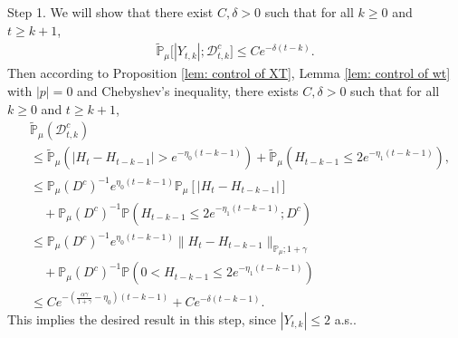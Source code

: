 \documentclass[12pt,a4paper]{amsart}
\theoremstyle{plain}
\theoremstyle{definition}
\numberwithin{equation}{section}
\begin{document}
    Step 1. We will show that there exist $C,\delta >0$ such that for all $k \geq 0$ and $t\geq k+1$,
\begin{equation}\begin{split}
\label{thm121}
    \mathbb{\tilde{P}}_{\mu}\big[|Y_{t,k}|;\mathcal{D}^c_{t,k}\big]
    \leq C e^{-\delta (t-k)}.
\end{split}\end{equation}
    Then according to Proposition \ref{lem: control of XT}, Lemma \ref{lem: control of wt} with $|p|=0$ and Chebyshev's inequality, there exists $C, \delta>0$ such that for all $k \geq 0$ and $t\geq k+1$,
\begin{equation}\begin{split}
\label{eq: prob of Dtkc}
    &\mathbb{\tilde{P}}_{\mu}(\mathcal{D}_{t,k}^c)
    \\&\leq \mathbb{\tilde{P}}_{\mu}(|H_t-H_{t-k-1}| > e^{-\eta_0 (t-k-1)})+\mathbb{\tilde{P}}_{\mu}(H_{t-k-1}\leq 2e^{-\eta_1(t-k-1)}),
    \\&\leq \mathbb{P}_{\mu}(D^c)^{-1}e^{\eta_0(t-k-1)}\mathbb{P}_{\mu}[|H_t-H_{t-k-1}|]
    \\&\quad +\mathbb{P}_{\mu}(D^c)^{-1} \mathbb P(H_{t-k-1}\leq 2e^{-\eta_1(t-k-1)}; D^c)
    \\&\leq \mathbb{P}_{\mu}(D^c)^{-1}  e^{\eta_0(t-k-1)}\|H_t - H_{t-k-1}\|_{\mathbb P_\mu; 1+\gamma}
    \\&\quad + \mathbb{P}_{\mu}(D^c)^{-1} \mathbb P(0<H_{t-k-1}\leq 2e^{-\eta_1(t-k-1)})
    \\&\leq C e^{-(\frac{\alpha \gamma}{1+\gamma} - \eta_0)(t-k-1)}+C e^{-\delta(t-k-1)}.
\end{split}\end{equation}
    This implies the desired result in this step, since $|Y_{t,k}| \leq 2$ a.s..
\end{document}
